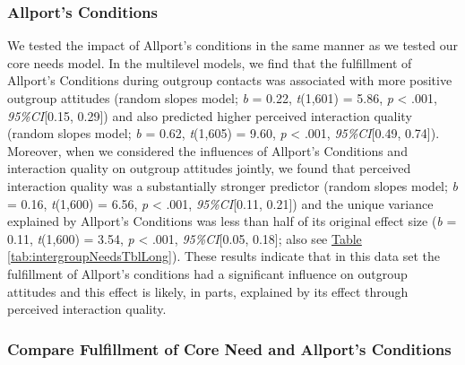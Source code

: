 \documentclass[man, 12pt, a4paper, mask]{apa7}
\theoremstyle{break}
\theoremstyle{plain}
\newcommand{\tblref}[2][]{\hyperref[#2]{Table \ref*{#2}#1}}
\begin{document}
\subsubsection{Allport's Conditions}

We tested the impact of Allport's conditions in the same manner as we
tested our core needs model. In the multilevel models, we find that the
fulfillment of Allport's Conditions during outgroup contacts was
associated with more positive outgroup attitudes (random slopes model;
\textit{b} = 0.22, \textit{t}(1,601) = 5.86, \textit{p} \textless{}
.001, \textit{95\%CI}{[}0.15, 0.29{]}) and also predicted higher
perceived interaction quality (random slopes model; \textit{b} = 0.62,
\textit{t}(1,605) = 9.60, \textit{p} \textless{} .001,
\textit{95\%CI}{[}0.49, 0.74{]}). Moreover, when we considered the
influences of Allport's Conditions and interaction quality on outgroup
attitudes jointly, we found that perceived interaction quality was a
substantially stronger predictor (random slopes model; \textit{b} =
0.16, \textit{t}(1,600) = 6.56, \textit{p} \textless{} .001,
\textit{95\%CI}{[}0.11, 0.21{]}) and the unique variance explained by
Allport's Conditions was less than half of its original effect size
(\textit{b} = 0.11, \textit{t}(1,600) = 3.54, \textit{p} \textless{}
.001, \textit{95\%CI}{[}0.05, 0.18{]}; also see
\tblref{tab:intergroupNeedsTblLong}). These results indicate that in
this data set the fulfillment of Allport's conditions had a significant
influence on outgroup attitudes and this effect is likely, in parts,
explained by its effect through perceived interaction quality.

\subsubsection{Compare Fulfillment of Core Need and Allport's Conditions}
\end{document}
